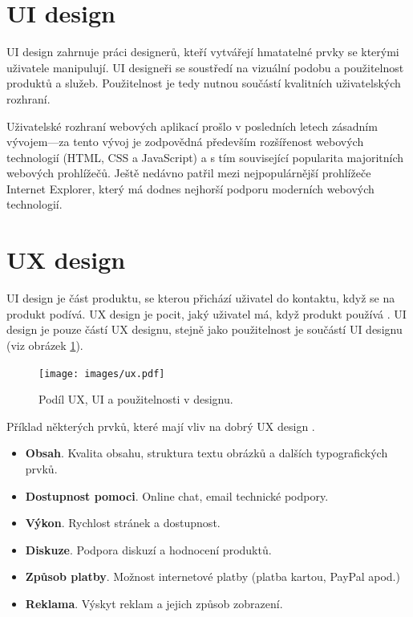 \section{UI design}
\label{sec:uidesign}

UI design zahrnuje práci designerů, kteří vytvářejí hmatatelné prvky se kterými uživatele manipulují. UI designeři se soustředí na vizuální podobu a použitelnost produktů a služeb. Použitelnost je tedy nutnou součástí kvalitních uživatelských rozhraní.

Uživatelské rozhraní webových aplikací prošlo v posledních letech zásadním vývojem---za tento vývoj je zodpovědná především rozšířenost webových technologií (HTML, CSS a JavaScript) a s tím související popularita majoritních webových prohlížečů. Ještě nedávno patřil mezi nejpopulárnější prohlížeče Internet Explorer, který má dodnes nejhorší podporu moderních webových technologií.

\section{UX design}
\label{sec:uxdesign}

UI design je část produktu, se kterou přichází uživatel do kontaktu, když se na produkt podívá. UX design je pocit, jaký uživatel má, když produkt používá \cite{ui-vs-ux}. UI design je pouze částí UX designu, stejně jako použitelnost je součástí UI designu (viz obrázek \ref{fig:ux-ui-usability}).

\begin{figure}[htbp]
    \centering
    \texttt{[image: images/ux.pdf]}
    \caption{Podíl UX, UI a použitelnosti v designu.}
    \label{fig:ux-ui-usability}
\end{figure}

Příklad některých prvků, které mají vliv na dobrý UX design \cite{understanding-ux-ui}.

\begin{itemize}
    \item \textbf{Obsah}. Kvalita obsahu, struktura textu obrázků a dalších typografických prvků.
    \item \textbf{Dostupnost pomoci}. Online chat, email technické podpory.
    \item \textbf{Výkon}. Rychlost stránek a dostupnost.
    \item \textbf{Diskuze}. Podpora diskuzí a hodnocení produktů.
    \item \textbf{Způsob platby}. Možnost internetové platby (platba kartou, PayPal apod.)
    \item \textbf{Reklama}. Výskyt reklam a jejich způsob zobrazení.
\end{itemize}

